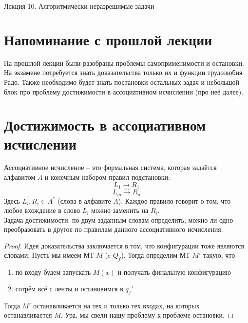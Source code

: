 \documentclass[11pt]{article}
\begin{document}
\begin{titlepage}
    \centering
    \vspace*{\fill}  %

    {\Huge Лекция 10. Алгоритмически неразрешимые задачи
    \par}

    \vspace*{\fill}  %
\end{titlepage}

\setcounter{page}{1}

\section{Напоминание с прошлой лекции}

На прошлой лекции были разобраны проблемы самоприменимости и остановки. 
На экзамене потребуется знать доказательства только их и функции трудолюбия 
Радо. Также необходимо будет знать постановки остальных задач и небольшой 
блок про проблему достижимости в ассоциативном исчислении (про неё далее).

\section{Достижимость в ассоциативном исчислении}

\begin{definition}
  Ассоциативное исчисление -- это формальная система, которая 
  задаётся алфавитом $A$ и конечным набором правил подстановки:
  \[L_1 \to R_1\]
  \[\dots\]
  \[L_m \to R_n\]
  Здесь $L_i, R_i \in A^{\ast}$ (слова в алфавите $A$). Каждое 
  правило говорит о том, что любое вхождение в слово $L_i$ можно 
  заменить на $R_i$. \\
  Задача достижимости: по двум заданным словам определить, можно 
  ли одно преобразовать в другое по правилам данного ассоциативного 
  исчисления.
\end{definition}

\begin{proof}
  Идея доказательства заключается в том, что конфигурации тоже 
  являются словами. Пусть мы имеем МТ $M$ (c $Q_f$). Тогда 
  определим МТ $M'$ такую, что 
  \begin{enumerate}
    \item по входу будем запускать $M(x)$ и получать финальную 
    конфигурацию 
    \item сотрём всё с ленты и остановимся в $q_f'$
  \end{enumerate}
  Тогда $M'$ останавливается на тех и только тех входах, на которых 
  останавливается $M$. Ура, мы свели нашу проблему к проблеме 
  остановки.
\end{proof}
\end{document}

